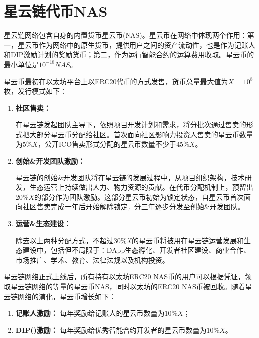\section{星云链代币NAS}
星云链网络包含自身的内置货币星云币(NAS)。星云币在网络中体现两个作用：第一，星云币作为网络中的原生货币，提供用户之间的资产流动性，也是作为记账人和DIP激励计划的奖励货币；第二，作为运行智能合约的运算费用收取。星云币的最小单位是$10^{-18}NAS$。

星云币最初在以太坊平台上以ERC20代币的方式发售，货币总量最大值为$X=10^8$枚，发行模式如下：
\begin{enumerate}
	\item \textbf{社区售卖：}
	
在星云链发起团队主导下，依照项目开发计划和需求，将分批次通过售卖的形式把大部分星云币分配给社区。首次面向社区影响力投资人售卖的星云币数量为$5\%X$，公开ICO售卖形式分配的星云币数量不少于$45\%X$。

	\item \textbf{创始\&开发团队激励：}

星云链的创始\&开发团队将在星云链的发展过程中，从项目组织架构，技术研发，生态运营上持续做出人力、物力资源的贡献。在代币分配机制上，预留出$20\%X$的部分作为团队激励。这部分星云币初始为锁定状态，自星云币首次面向社区售卖完成一年后开始解除锁定，分三年逐步分发至创始\&开发团队。

	\item \textbf{运营\&生态建设：}

除去以上两种分配方式，不超过$30\%X$的星云币将被用在星云链运营发展和生态建设中，包括但不局限于：DApp生态孵化、开发者社区建设、商业合作、市场推广、学术、教育、法律法规以及机构投资。
\end{enumerate}

星云链网络正式上线后，所有持有以太坊ERC20 NAS币的用户可以根据凭证，领取星云链网络的等量的星云币NAS，同时以太坊的ERC20 NAS币被回收。随着星云链网络的演化，星云币增长如下：
\begin{enumerate}
	\item \textbf{记账人激励：}
	每年奖励给记账人的星云币数量为$10\%X$；
	
	\item \textbf{DIP()激励：}
	每年奖励给优秀智能合约开发者的星云币数量为$10\%X$。
\end{enumerate}
